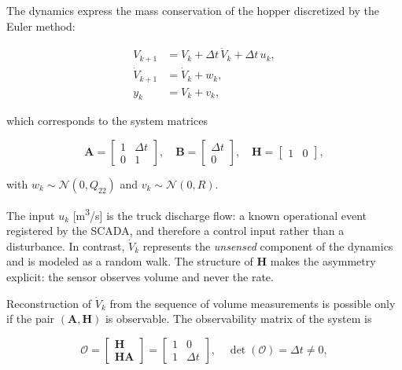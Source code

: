 \documentclass[conference]{IEEEtran}
\begin{document}
The dynamics express the mass conservation of the hopper discretized by the
Euler method:

\begin{align}
V_{k+1} &= V_{k} + \Delta t\,\dot{V}_{k} + \Delta t\,u_{k}, \label{eq:vol}\\
\dot{V}_{k+1} &= \dot{V}_{k} + w_{k}, \label{eq:rate}\\
y_{k} &= V_{k} + v_{k}, \label{eq:obs}
\end{align}

which corresponds to the system matrices

\begin{equation}
\mathbf{A} = \begin{bmatrix} 1 & \Delta t\\ 0 & 1\end{bmatrix},\quad
\mathbf{B} = \begin{bmatrix} \Delta t\\ 0\end{bmatrix},\quad
\mathbf{H} = \begin{bmatrix} 1 & 0\end{bmatrix},
\label{eq:matrices}
\end{equation}

with $w_{k} \sim \mathcal{N}(0, Q_{22})$ and $v_{k} \sim \mathcal{N}(0, R)$.

The input $u_{k}$ [m\textsuperscript{3}/s] is the truck discharge flow: a known
operational event registered by the SCADA, and therefore a control input rather
than a disturbance. In contrast, $\dot{V}_{k}$ represents the \emph{unsensed}
component of the dynamics and is modeled as a random walk. The structure of
$\mathbf{H}$ makes the asymmetry explicit: the sensor observes volume and never
the rate.

Reconstruction of $\dot{V}_{k}$ from the sequence of volume measurements is
possible only if the pair $(\mathbf{A}, \mathbf{H})$ is observable. The
observability matrix of the system is

\begin{equation}
\mathcal{O} = \begin{bmatrix} \mathbf{H} \\ \mathbf{H}\mathbf{A}\end{bmatrix}
= \begin{bmatrix} 1 & 0\\ 1 & \Delta t\end{bmatrix},
\quad \det(\mathcal{O}) = \Delta t \neq 0,
\label{eq:observability}
\end{equation}
\end{document}
